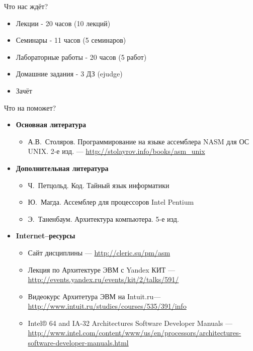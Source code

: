 \documentclass{beamer}
\begin{document}
    \begin{frame}{Что нас ждёт?}
        \begin{itemize}
            \item Лекции - 20 часов (10 лекций)
            \item Семинары - 11 часов (5 семинаров)
            \item Лабораторные работы - 20 часов (5 работ)
            \item Домашние задания - 3 ДЗ (ejudge)
            \item Зачёт
        \end{itemize}
    \end{frame}
    \begin{frame}{Что на поможет?}
        \begin{itemize}
            \item {\bf Основная литература}
            \begin{itemize}
                \item А.В.~Столяров. Программирование на языке ассемблера NASM для ОС UNIX. 2-е изд. --- \url{http://stolayrov.info/books/asm_unix}
            \end{itemize}
            \item {\bf Дополнительная литература}
            \begin{itemize}
                \item Ч.~Петцольд. Код. Тайный язык информатики
                \item Ю.~Магда. Ассемблер для процессоров Intel Pentium
                \item Э.~Таненбаум. Архитектура компьютера. 5-е изд.
            \end{itemize}
            \item {\bf Internet--ресурсы}
            \begin{itemize}
                \item Сайт дисциплины --- \url{http://cleric.su/pm/asm}
                \item Лекция по Архитектуре ЭВМ с Yandex КИТ --- \url{http://events.yandex.ru/events/kit/2/talks/591/}
                \item Видеокурс Архитетура ЭВМ на Intuit.ru--- \url{http://www.intuit.ru/studies/courses/535/391/info}
                \item Intel® 64 and IA-32 Architectures Software Developer Manuals --- \url{http://www.intel.com/content/www/us/en/processors/architectures-software-developer-manuals.html}
            \end{itemize}
        \end{itemize}
    \end{frame}
\end{document}
